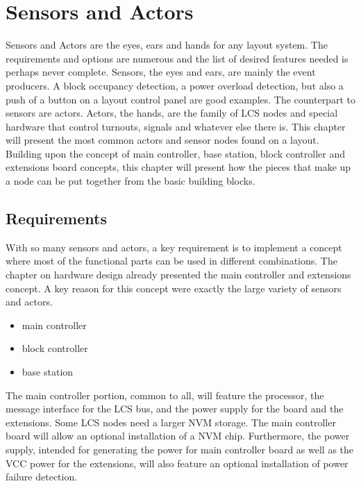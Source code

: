 \chapter{Sensors and Actors}

Sensors and Actors are the eyes, ears and hands for any layout system. The requirements and options are numerous and the list of desired features needed is perhaps never complete. Sensors, the eyes and ears, are mainly the event producers. A block occupancy detection, a power overload detection, but also a push of a button on a layout control panel are good examples. The counterpart to sensors  are actors. Actors, the hands, are the family of LCS nodes and special hardware that control turnouts, signals and whatever else there is. This chapter will present the most common actors and sensor nodes found on a layout. Building upon the concept of main controller, base station, block controller and extensions board concepts, this chapter will present how the pieces that make up a node can be put together from the basic building blocks.

\section{Requirements}

With so many sensors and actors, a key requirement is to implement a concept where most of the functional parts can be used in different combinations. The chapter on hardware design already presented the main controller and extensions concept. A key reason for this concept were exactly the large variety of sensors and actors.

\begin{itemize}
\item main controller
\item block controller
\item base station
\end{itemize}

The main controller portion, common to all, will feature the processor, the message interface for the LCS bus, and the power supply for the board and the extensions. Some LCS nodes need a larger NVM storage. The main controller board will allow an optional installation of a NVM chip. Furthermore, the power supply, intended for generating the power for main controller board as well as the VCC power for the extensions, will also feature an optional installation of power failure detection.

